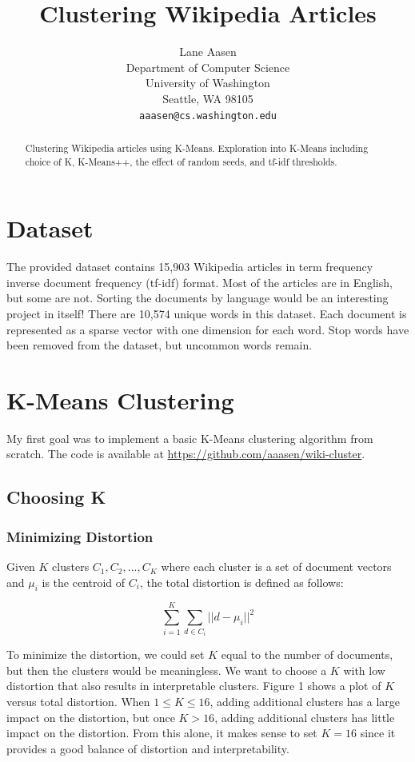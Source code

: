 \documentclass{article} %
\title{Clustering Wikipedia Articles}
\author{
Lane Aasen\\
Department of Computer Science\\
University of Washington\\
Seattle, WA 98105\\
\texttt{aaasen@cs.washington.edu}\\
}
\begin{document}
\maketitle

\begin{abstract}
Clustering Wikipedia articles using K-Means. Exploration into K-Means including choice of K, K-Means++, the effect of random seeds, and tf-idf thresholds.
\end{abstract}


\section{Dataset}

The provided dataset contains 15,903 Wikipedia articles in term frequency inverse document frequency (tf-idf) format. Most of the articles are in English, but some are not. Sorting the documents by language would be an interesting project in itself! There are 10,574 unique words in this dataset. Each document is represented as a sparse vector with one dimension for each word. Stop words have been removed from the dataset, but uncommon words remain.

\section{K-Means Clustering}

My first goal was to implement a basic K-Means clustering algorithm from scratch. The code is available at \url{https://github.com/aaasen/wiki-cluster}.

\subsection{Choosing K}

\subsubsection{Minimizing Distortion}

Given $K$ clusters $C_{1},C_{2},...,C_{K}$ where each cluster is a set of document vectors and $\mu_{i}$ is the centroid of $C_{i}$, the total distortion is defined as follows:

$$\sum_{i=1}^{K}\sum_{d \in C_{i}} ||d - \mu_{i}||^{2}$$

To minimize the distortion, we could set $K$ equal to the number of documents, but then the clusters would be meaningless. We want to choose a $K$ with low distortion that also results in interpretable clusters. Figure 1 shows a plot of $K$ versus total distortion. When $1 \leq K \leq 16$, adding additional clusters has a large impact on the distortion, but once $K > 16$, adding additional clusters has little impact on the distortion. From this alone, it makes sense to set $K=16$ since it provides a good balance of distortion and interpretability.
\end{document}
